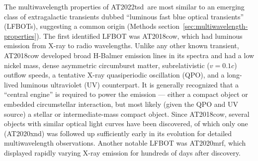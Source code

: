 \documentclass{nature_plusfigure}
\newcommand{\at}{AT2022tsd}
\begin{document}
The multiwavelength properties of \at\ are most similar to an emerging class of extragalactic transients dubbed ``luminous fast blue optical transients'' (LFBOTs\cite{Metzger2022}), suggesting a common origin (Methods section~\ref{sec:multiwavelength-properties}). The first identified LFBOT was AT2018cow\cite{Prentice2018}, which had luminous emission from X-ray to radio wavelengths\cite{RiveraSandoval2018,Margutti2019,Ho2019}. Unlike any other known transient, AT2018cow developed broad H-Balmer emission lines in its spectra\cite{Perley2019} and had a low nickel mass\cite{Perley2019}, dense\cite{Ho2019} asymmetric\cite{Margutti2019,Maund2023} circumburst matter, subrelativistic ($v=0.1c$)\cite{Ho2019} outflow speeds, a tentative X-ray quasiperiodic oscillation (QPO\cite{Pasham2021,Zhang2022}), and a long-lived luminous ultraviolet (UV) counterpart\cite{Sun2023}. It is generally recognized that a ``central engine'' is required to power the emission --- either a compact object\cite{Prentice2018,Perley2019,Margutti2019,Ho2019} or embedded circumstellar interaction\cite{Margutti2019}, but most likely (given the QPO and UV source) a stellar\cite{Margutti2019,Pasham2021} or intermediate-mass\cite{Kuin2019,Perley2019,Zhang2022,Chen2023} compact object. 
Since AT2018cow, several objects with similar optical light curves have been discovered\cite{Coppejans2020,Ho2020_Koala,Perley2021,Yao2022}, of which only one (AT2020xnd\cite{Perley2021}) was followed up sufficiently early in its evolution for detailed multiwavelength observations\cite{Bright2022,Ho2022_AT2020xnd}.
Another notable LFBOT was AT2020mrf\cite{Yao2022}, which displayed rapidly varying X-ray emission for hundreds of days after discovery.
\end{document}
